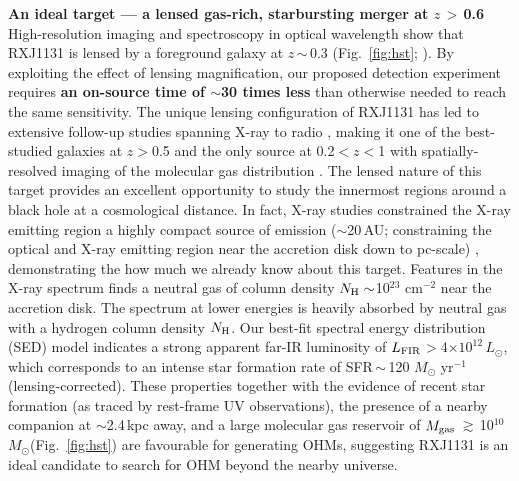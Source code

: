 \documentclass[letterpaper,11pt]{article}
\newcommand{\Lsun}{\mbox{$L_{\odot}$}\xspace}
\newcommand{\Msun}{\mbox{$M_{\odot}$}\xspace}
\newcommand{\LFIR}{\mbox{$L_{\rm FIR}$}\xspace}
\newcommand{\pmOne}{\mbox{$^{-1}$}\xspace}
\newcommand{\Fig}[1]{Fig.~\ref{fig:#1}}
\newcommand{\E}[1]{\mbox{$\times10^{#1}$}}
\newcommand{\ssim}{\,$\sim$\,}
\newcommand{\obs}{observations\xspace}
\begin{document}
\noindent \textbf{An ideal target --- a lensed gas-rich, starbursting merger at $z$\,$>$\,0.6}\\ 
\indent High-resolution imaging and spectroscopy in optical wavelength show that RXJ1131 is 
lensed by a foreground galaxy at $z$\ssim0.3 (\Fig{hst}; \citealt{Sluse03a}). 
By exploiting the effect of lensing magnification, 
our proposed detection experiment requires {\bf an on-source time of  %
$\sim$30 times less} than otherwise needed to reach the same sensitivity. 
The unique lensing configuration of RXJ1131 has led to extensive follow-up studies spanning X-ray to radio \citep[\Fig{hst}; e.g.,][]{Claeskens06a, Sluse07a, Pooley07a, Reis14a, Leung17a}, 
making it one of the best-studied galaxies at $z$$>$0.5 and 
the only source at 0.2$<$$z$$<$1 with spatially-resolved imaging of the molecular gas distribution \citep{Leung17a}. 
The lensed nature of this target provides an excellent 
opportunity to study the innermost regions around a black hole at a cosmological distance.
In fact, X-ray studies constrained the X-ray emitting region a highly compact source of emission 
($\sim$20\,AU; constraining the optical and X-ray emitting region near the accretion disk down to pc-scale) \citep{Dai10a},
demonstrating the how much we already know about this target.
Features in the X-ray spectrum finds 
a neutral gas of column density $N_{\rm H}\sim$10$^{23}$ cm$^{-2}$ near the accretion disk. %
The spectrum at lower energies is heavily absorbed by neutral gas with a hydrogen column density $N_{\rm H}$.
Our best-fit spectral energy distribution (SED) model indicates
a strong apparent far-IR luminosity of \LFIR$>$4\E{12}\,\Lsun, which corresponds to
an intense star formation rate of SFR\ssim120 \Msun yr\pmOne (lensing-corrected).
These properties together with the evidence of recent star formation (as traced by rest-frame UV \obs),
the presence of a nearby companion at $\sim$2.4\,kpc away, and a large molecular gas reservoir of $M_{\rm gas}$\,$\gtrsim$\,10$^{10}$\Msun (\Fig{hst}) 
are favourable for generating OHMs, suggesting RXJ1131 is an ideal candidate 
to search for OHM beyond the nearby universe.
\end{document}

